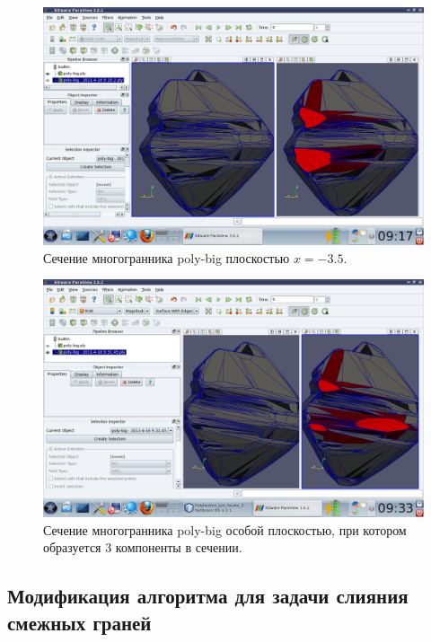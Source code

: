 \documentclass[a4paper,12pt, titlepage]{article}
\begin{document}
	\begin{flushleft}
		\begin{figure}
		    \includegraphics[trim = 220 65 10 140, clip, width=15cm]{poly-big/35.png}
		    \caption{Сечение многогранника poly-big плоскостью $x = -3.5$.}
		    \label{poly-big-5}
		\end{figure}

	\end{flushleft}
	\begin{flushleft}
		\begin{figure}
		    \includegraphics[trim = 350 65 10 140, clip, width=15cm]{poly-big/3components.png}
		    \caption{Сечение многогранника poly-big особой плоскостью, при котором образуется 3 компоненты в 
		    сечении.}
		    \label{poly-big-6}
		\end{figure}
	\end{flushleft}

\newpage
\subsection{Модификация алгоритма для задачи слияния смежных граней}
\end{document}
